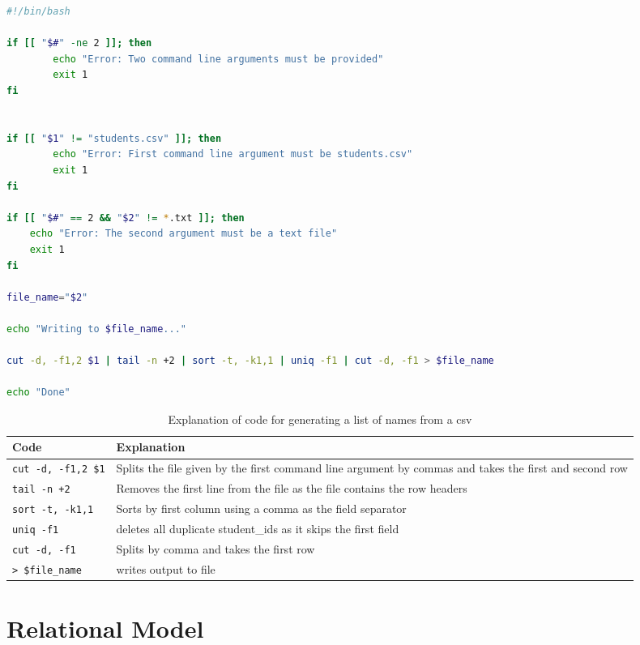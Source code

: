 \documentclass{article}
\begin{document}
\begin{lstlisting}[language=Bash, caption=CSV to TXT script]
#!/bin/bash

if [[ "$#" -ne 2 ]]; then
        echo "Error: Two command line arguments must be provided"
        exit 1
fi


if [[ "$1" != "students.csv" ]]; then
        echo "Error: First command line argument must be students.csv"
        exit 1
fi

if [[ "$#" == 2 && "$2" != *.txt ]]; then
	echo "Error: The second argument must be a text file"
	exit 1
fi

file_name="$2"

echo "Writing to $file_name..."

cut -d, -f1,2 $1 | tail -n +2 | sort -t, -k1,1 | uniq -f1 | cut -d, -f1 > $file_name

echo "Done"
\end{lstlisting}

\begin{table}[H]
    \centering
    \begin{tabularx}{\textwidth}{|X|X|} %
        \hline
        \textbf{Code} & \textbf{Explanation} \\
        \hline
        \verb|cut -d, -f1,2 $1| & Splits the file given by the first command line argument by commas and takes the first and second row \\
        \hline
        \verb|tail -n +2|& Removes the first line from the file as the file contains the row headers \\
        \hline
        \verb|sort -t, -k1,1| & Sorts by first column using a comma as the field separator  \\
        \hline
        \verb|uniq -f1| & deletes all duplicate student\_ids as it skips the first field \\
        \hline
        \verb|cut -d, -f1| & Splits by comma and takes the first row \\
        \hline
        \verb|> $file_name| & writes output to file \\
        \hline
    \end{tabularx}
    \caption{Explanation of code for generating a list of names from a csv}
\end{table}

\section{Relational Model}
\end{document}
